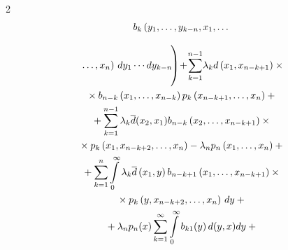 \begin{multicols}{2}
\begin{multline*}
b_k\left(y_1,\ld,y_{k-n},x_1,\ld\right.


\end{multline*}





\noindent


\begin{multline}


\left.\left.{}\ld,x_{n}\right)\, dy_1\cdots dy_{k-n}


\vphantom{\mathop{\int\!\cdots\!\int}\limits_{y_1,\ld,y_{k-1}>0}\sum\limits^\infty}


\!\right)\!


+\!


\sum\limits_{k=1}^{n-1}\! \lambda_k d\left(x_1,x_{n-k+1}\right) 


\times{}\\


{}\times b_{n-k}\left(x_1,\ld,x_{n-k}\right) p_k\left(x_{n-k+1},\ld,x_{n}\right)


+{}


\\


{}+


 \sum\limits_{k=1}^{n-1} \lambda_k \d(x_2,x_{1})


b_{n-k}\left(x_2,\ld,x_{n-k+1}\right)\times{}\\


{}\times


p_k\left(x_1,x_{n-k+2},\ld,x_{n}\right) -


\lambda_n p_n\left(x_1,\ld,x_n\right) +{}


\\


{}+


 \sum\limits_{k=1}^{n} \int\limits_0^\infty \lambda_k


\d\left(x_{1},y\right) b_{n-k+1}\left(x_1,\ld,x_{n-k+1}\right)\times{}\\


{}\times


p_k\left(y,x_{n-k+2},\ld,x_{n}\right)\, dy +{}


\\


{}+


\lambda_n p_n(x) \sum\limits_{k=1}^\infty


\int\limits_0^\infty b_{k1}(y)\, d(y,x) dy


+{}


\\



\end{multline}
\end{multicols}
